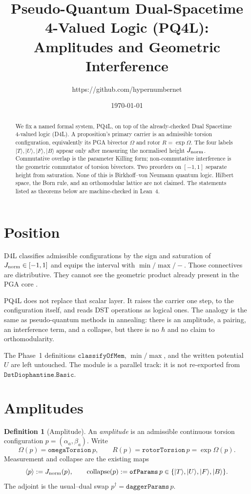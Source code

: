 \documentclass[dvipdfmx,11pt,a4paper]{article}
\title{Pseudo-Quantum Dual-Spacetime 4-Valued Logic (PQ4L):\\
Amplitudes and Geometric Interference}
\author{https://github.com/hypernumbernet}
\date{\today}
\theoremstyle{definition}
\newtheorem{definition}[theorem]{Definition}
\theoremstyle{remark}
\newcommand{\Jnorm}{J_{\rm norm}}
\begin{document}
\maketitle

\begin{abstract}
We fix a named formal system, PQ4L, on top of the already-checked Dual
Spacetime 4-valued logic (D4L). A proposition's primary carrier is an
admissible torsion configuration, equivalently its PGA bivector
\(\Omega\) and rotor \(R=\exp\Omega\). The four labels
\(\lvert T\rangle,\lvert U\rangle,\lvert F\rangle,\lvert B\rangle\)
appear only after measuring the normalised height \(\Jnorm\).
Commutative overlap is the parameter Killing form; non-commutative
interference is the geometric commutator of torsion bivectors. Two
preorders on \([-1,1]\) separate height from saturation. None of this
is Birkhoff--von Neumann quantum logic. Hilbert space, the Born rule,
and an orthomodular lattice are not claimed. The statements listed as
theorems below are machine-checked in Lean~4.
\end{abstract}

\section{Position}

D4L \cite{D4L2026} classifies admissible configurations by the sign and
saturation of \(\Jnorm\in[-1,1]\) and equips the interval with
\(\min/\max/-\). Those connectives are distributive. They cannot see
the geometric product already present in the PGA core \cite{Diophantine2026}.

PQ4L does not replace that scalar layer. It raises the carrier one
step, to the configuration itself, and reads DST operations as logical
ones. The analogy is the same as pseudo-quantum methods in annealing:
there is an amplitude, a pairing, an interference term, and a
collapse, but there is no \(\hbar\) and no claim to orthomodularity.

The Phase~1 definitions \(\texttt{classifyOfMem}\), \(\min/\max\), and
the written potential \(U\) are left untouched. The module is a
parallel track: it is not re-exported from \(\texttt{DstDiophantine.Basic}\).

\section{Amplitudes}

\begin{definition}[Amplitude]
\label{def:amp}
An \emph{amplitude} is an admissible continuous torsion configuration
\(p=(\alpha_a,\beta_a)\). Write
\[
\Omega(p)=\texttt{omegaTorsion}\,p,\qquad
R(p)=\texttt{rotorTorsion}\,p=\exp\Omega(p).
\]
Measurement and collapse are the existing maps
\[
\langle p\rangle:=\Jnorm(p),\qquad
\mathrm{collapse}(p):=\texttt{ofParams}\,p\in\{\lvert T\rangle,\lvert U\rangle,\lvert F\rangle,\lvert B\rangle\}.
\]
The adjoint is the usual--dual swap \(p^\dagger=\texttt{daggerParams}\,p\).
\end{definition}
\end{document}
